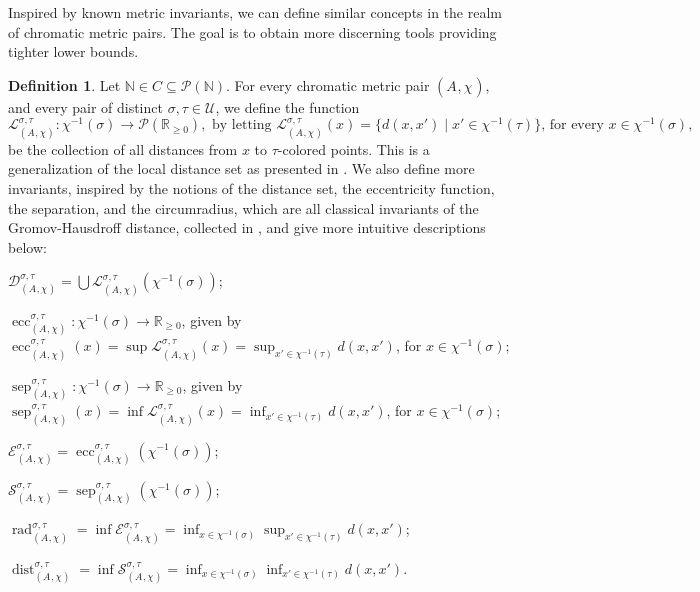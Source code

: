 \documentclass[8pt,a4paper,oneside,english,english]{article}
\theoremstyle{plain}
\theoremstyle
{plain}
\theoremstyle{definition}
\newtheorem{definition}[theorem]{Definition}%
\newcommand{\N}{\mathbb{N}}
\newcommand{\R}{\mathbb{R}}
\newcommand{\MP}[1]{(A_{#1},\chi_{#1})}
\DeclareMathOperator{\dist}{dist}
\DeclareMathOperator{\ecc}{ecc}
\DeclareMathOperator{\rad}{rad}
\DeclareMathOperator{\sep}{sep}
\begin{document}
Inspired by known metric invariants, we can define similar concepts in the realm of chromatic metric pairs. The goal is to obtain more discerning tools providing tighter lower bounds. 



\begin{definition}\label{def:cchromatic_invariants}
    Let $\N\in C\subseteq\mathcal P(\N)$.
    For every chromatic metric pair $\MP{}$, and every pair of distinct $\sigma,\tau\in\mathcal U$, we define the function
    \[
        \mathcal L_{\MP{}}^{\sigma,\tau}\colon\chi^{-1}(\sigma)\to\mathcal P(\R_{\geq 0}),
        \text{ by letting }\mathcal L_{\MP{}}^{\sigma,\tau}(x)=\{d(x,x')\mid x'\in\chi^{-1}(\tau)\}
        \text{, for every $x\in\chi^{-1}(\sigma)$,}
    \]
    be the collection of all distances from $x$ to $\tau$-colored points.
    This is a generalization of the local distance set as presented in \cite{Mem12}.
    We also define more invariants, inspired by the notions of the distance set, the eccentricity function, the separation, and the circumradius, which are all classical invariants of the Gromov-Hausdroff distance, collected in \cite{Mem12}, and give more intuitive descriptions below:
    \begin{compactenum}[-]
        \item $\mathcal D_{\MP{}}^{\sigma,\tau}=\bigcup\mathcal L_{\MP{}}^{\sigma,\tau}(\chi^{-1}(\sigma))$;
        
        \item $\ecc_{\MP{}}^{\sigma,\tau}\colon\chi^{-1}(\sigma)\to\R_{\geq 0}$, 
        given by 
        $\ecc_{\MP{}}^{\sigma,\tau}(x)=\sup\mathcal L_{\MP{}}^{\sigma,\tau}(x) = \sup_{x'\in\chi^{-1}(\tau)}d(x,x')$, for $x\in\chi^{-1}(\sigma)$;
        
        \item $\sep_{\MP{}}^{\sigma,\tau}\colon\chi^{-1}(\sigma)\to\R_{\geq 0}$, given by 
        $\sep_{\MP{}}^{\sigma,\tau}(x)=\inf\mathcal L_{\MP{}}^{\sigma,\tau}(x)
        = \inf_{x'\in\chi^{-1}(\tau)}d(x,x')$, for $x\in\chi^{-1}(\sigma)$;
        
        \item $\mathcal E_{\MP{}}^{\sigma,\tau}=\ecc_{\MP{}}^{\sigma,\tau}(\chi^{-1}(\sigma))$;
        
        \item $\mathcal S_{\MP{}}^{\sigma,\tau}=\sep_{\MP{}}^{\sigma,\tau}(\chi^{-1}(\sigma))$;
        
        \item $\rad_{\MP{}}^{\sigma,\tau}=\inf\mathcal E_{\MP{}}^{\sigma,\tau}
         = \inf_{x\in\chi^{-1}(\sigma)}\sup_{x'\in\chi^{-1}(\tau)}d(x,x')$;
        
        \item $\dist_{\MP{}}^{\sigma,\tau}=\inf\mathcal S_{\MP{}}^{\sigma,\tau}
         = \inf_{x\in\chi^{-1}(\sigma)}\inf_{x'\in\chi^{-1}(\tau)}d(x,x')$.
    \end{compactenum}
    
\end{definition}
\end{document}

